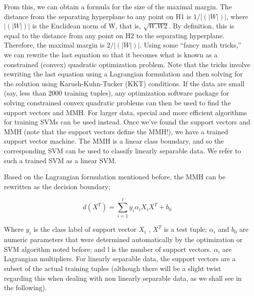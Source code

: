 \documentclass[12pt,fleqn]{book} %
\begin{document}
From this, we can obtain a formula for the size of the maximal margin. The distance from the separating hyperplane to any point on H1 is $1/|(|W|)|$, where $|(|W|)|$ is the Euclidean norm of W, that is, $\sqrt{W . W2}$. By definition, this is equal to the distance from any point on H2 to the separating hyperplane. Therefore, the maximal margin is $2/|(|W|)|$. Using some “fancy math tricks,” we can rewrite the last equation so that it becomes what is known as a constrained (convex) quadratic optimization problem. Note that the tricks involve rewriting the last equation using a Lagrangian formulation and then solving for the solution using Karush-Kuhn-Tucker (KKT) conditions. If the data are small (say, less than 2000 training tuples), any optimization software package for solving constrained convex quadratic problems can then be used to find the support vectors and MMH. For larger data, special and more efficient algorithms for training SVMs can be used instead. Once we’ve found the support vectors and MMH (note that the support vectors define the MMH!), we have a trained support vector machine. The MMH is a linear class boundary, and so the corresponding SVM can be used to classify linearly separable data. We refer to such a trained SVM as a linear SVM.\bigskip

Based on the Lagrangian formulation mentioned before, the MMH can be rewritten as the decision boundary;

\begin{dBox}
\begin{equation}
d(X^{T}) = \sum_{i=1}^{l}{y_i \alpha_i X_i X^T} + b_0
\end{equation}
\end{dBox}

Where $y_i$  is the class label of support vector $X_i$ , $X^T$ is a test tuple; $\alpha_i$ and $b_0$ are numeric parameters that were determined automatically by the optimization or SVM algorithm noted before; and l is the number of support vectors. $\alpha_i$ are Lagrangian multipliers. For linearly separable data, the support vectors are a subset of the actual training tuples (although there will be a slight twist regarding this when dealing with non linearly separable data, as we shall see in the following).\bigskip
\end{document}
